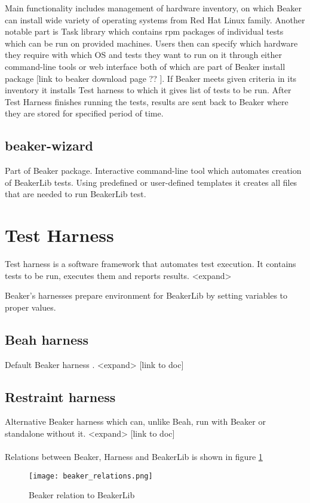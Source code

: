 Main functionality includes management of hardware inventory, on which Beaker can install wide variety  of operating systems from Red Hat Linux family. Another notable part  is Task library which contains rpm packages of individual tests which can be run on provided machines. 
Users then can specify which hardware they require with which OS and tests they want to run on it through either command-line tools or web interface both of which are part of Beaker install package [link to beaker download page ?? ]. If Beaker meets given criteria in its inventory it installs Test harness to which it gives list of tests to be run.  After Test Harness finishes running the tests, results are sent back to Beaker where they are stored for specified period of time. 

\subsection{beaker-wizard}
Part of Beaker package. Interactive command-line tool which automates creation of BeakerLib tests. Using predefined or user-defined templates it creates all files that are needed to run BeakerLib test.

\section{Test Harness}
Test harness is a software framework that automates test execution. It contains tests to be run, executes them and reports results. <expand>

Beaker’s harnesses prepare environment for BeakerLib by setting variables to proper values.

\subsection{Beah harness}
Default Beaker harness . <expand> [link to doc]

\subsection{Restraint harness}
Alternative Beaker harness which can, unlike Beah, run with Beaker or standalone without it. <expand> [link to doc]
\\
\\
Relations between Beaker, Harness and BeakerLib is shown in figure \ref{fig:beaker_relation}

\begin{figure}[h!]
  \texttt{[image: beaker\_relations.png]}
  \caption{Beaker relation to BeakerLib}
  \label{fig:beaker_relation}
\end{figure}




